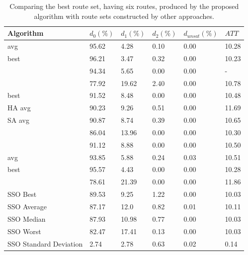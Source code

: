     \begin{table}[H]
    \centering
    \hspace*{-1.0cm}
    \begin{tabular}{|l||l|l|l|l|l|}
    \hline
    Algorithm & $d_0(\%)$ & $d_1(\%)$ & $d_2(\%)$ & $d_{unsat}(\%)$ & $ATT$ \\
    \hline
    \citet{kechagiopoulos14} avg & 95.62 & 4.28 & 0.10 & 0.00 & 10.28 \\
    \citet{kechagiopoulos14} best & 96.21 & 3.47 & 0.32 & 0.00 & 10.23 \\
    \citet{nikolic14} & 94.34 & 5.65 & 0.00 & 0.00 & - \\
    \citet{kidwai98} & 77.92 & 19.62 & 2.40 & 0.00 & 10.78 \\
    \citet{fan10} best & 91.52 & 8.48 & 0.00 & 0.00 & 10.48  \\
    \citet{fan10} HA avg & 90.23 & 9.26 & 0.51 & 0.00 & 11.69 \\
    \citet{fan10} SA avg & 90.87 & 8.74 & 0.39 & 0.00 & 10.65 \\
    \citet{chakroborty02} & 86.04 & 13.96 & 0.00 & 0.00 & 10.30 \\
    \citet{zhang10} & 91.12 & 8.88 & 0.00 & 0.00 & 10.50 \\
    \citet{chew12} avg & 93.85 & 5.88 & 0.24 & 0.03 & 10.51 \\
    \citet{chew12} best & 95.57 & 4.43 & 0.00 & 0.00 & 10.28 \\
    \citet{baaj91} & 78.61 & 21.39 & 0.00 & 0.00 & 11.86 \\
    \hline
    \hline
    SSO Best & 89.53 & 9.25 & 1.22 & 0.00 & 10.03\\
    SSO Average & 87.17 & 12.0 & 0.82 & 0.01 & 10.11\\
    SSO Median & 87.93 & 10.98 & 0.77 & 0.00 & 10.03\\
    SSO Worst & 82.47 & 17.41 & 0.13 & 0.00 & 10.03\\
    SSO Standard Deviation & 2.74 & 2.78 & 0.63 & 0.02 & 0.14\\
    \hline
    \end{tabular}
    \caption {Comparing the best route set, having six routes, produced by the proposed algorithm with route sets constructed by other approaches.}
    \label{table:performanceComparison_6}
    \end{table}


